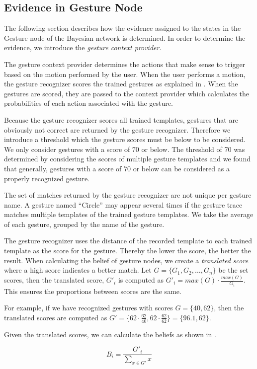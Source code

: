 \subsection{Evidence in Gesture Node}
\label{sec:design:bayesian-network:gesture-node-evidence}

The following section describes how the evidence assigned to the states in the Gesture node of the Bayesian network is determined. In order to determine the evidence, we introduce the \emph{gesture context provider}.

The gesture context provider determines the actions that make sense to trigger based on the motion performed by the user. When the user performs a motion, the gesture recognizer scores the trained gestures as explained in . When the gestures are scored, they are passed to the context provider which calculates the probabilities of each action associated with the gesture. 

Because the gesture recognizer scores all trained templates, gestures that are obviously not correct are returned by the gesture recognizer. Therefore we introduce a threshold which the gesture scores must be below to be considered. We only consider gestures with a score of 70 or below. The threshold of 70 was determined by considering the scores of multiple gesture templates and we found that generally, gestures with a score of 70 or below can be considered as a properly recognized gesture.

The set of matches returned by the gesture recognizer are not unique per gesture name. A gesture named ``Circle'' may appear several times if the gesture trace matches multiple templates of the trained gesture templates. We take the average of each gesture, grouped by the name of the gesture.

The gesture recognizer uses the distance of the recorded template to each trained template as the score for the gesture. Thereby the lower the score, the better the result. When calculating the belief of gesture nodes, we create a \emph{translated score} where a high score indicates a better match. Let $G = \{G_1, G_2, \ldots, G_n\}$ be the set scores, then the translated score, $G'_i$ is computed as $G'_i = max(G) \cdot \frac{max(G)}{G_i}$. This ensures the proportions between scores are the same.

For example, if we have recognized gestures with scores $G = \{40, 62\}$, then the translated scores are computed as $G' = \{ 62 \cdot \frac{62}{40}, 62 \cdot \frac{62}{62} \} = \{ 96.1, 62 \}$.

Given the translated scores, we can calculate the beliefs as shown in .

\begin{equation}
B_i = \frac{{G'}_{i}}{\sum\limits_{x \in G'} x}
\label{eq:gesture-belief}
\end{equation}


